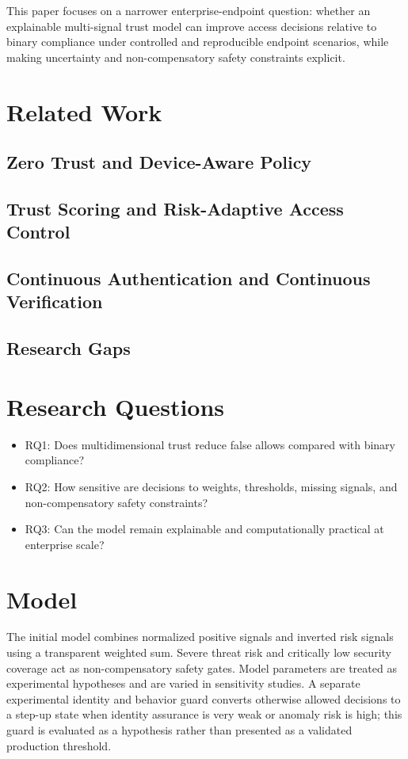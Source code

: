 \documentclass[journal]{IEEEtran}
\begin{document}
This paper focuses on a narrower enterprise-endpoint question: whether an explainable
multi-signal trust model can improve access decisions relative to binary compliance
under controlled and reproducible endpoint scenarios, while making uncertainty and
non-compensatory safety constraints explicit.

\section{Related Work}
\subsection{Zero Trust and Device-Aware Policy}
\subsection{Trust Scoring and Risk-Adaptive Access Control}
\subsection{Continuous Authentication and Continuous Verification}
\subsection{Research Gaps}

\section{Research Questions}
\begin{itemize}
    \item RQ1: Does multidimensional trust reduce false allows compared with binary compliance?
    \item RQ2: How sensitive are decisions to weights, thresholds, missing signals, and non-compensatory safety constraints?
    \item RQ3: Can the model remain explainable and computationally practical at enterprise scale?
\end{itemize}

\section{Model}
The initial model combines normalized positive signals and inverted risk signals using
a transparent weighted sum. Severe threat risk and critically low security coverage
act as non-compensatory safety gates. Model parameters are treated as experimental
hypotheses and are varied in sensitivity studies. A separate experimental identity
and behavior guard converts otherwise allowed decisions to a step-up state when
identity assurance is very weak or anomaly risk is high; this guard is evaluated as a
hypothesis rather than presented as a validated production threshold.
\end{document}
